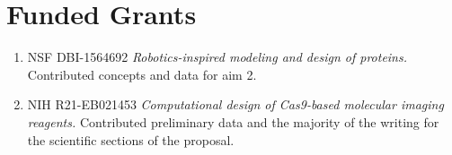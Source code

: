 \section{Funded Grants}

\begin{enumerate}

\item NSF DBI-1564692 \emph{Robotics-inspired modeling and design 
        of proteins.}  Contributed concepts and data for aim 2.

\item NIH R21-EB021453 \emph{Computational design of Cas9-based molecular 
    imaging reagents.}  Contributed preliminary data and the majority of the 
        writing for the scientific sections of the proposal.

\end{enumerate}

